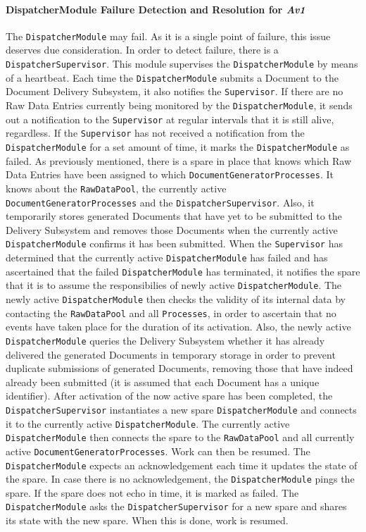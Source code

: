 \documentclass[a4paper,10pt]{article}
\begin{document}
\paragraph{DispatcherModule Failure Detection and Resolution for \emph{Av1}}
The \texttt{DispatcherModule} may fail. As it is a single point of failure, this issue deserves due consideration. In order to detect failure, there is a \texttt{DispatcherSupervisor}. This module supervises the \texttt{DispatcherModule} by means of a heartbeat. Each time the \texttt{DispatcherModule} submits a Document to the Document Delivery Subsystem, it also notifies the \texttt{Supervisor}. If there are no Raw Data Entries currently being monitored by the \texttt{DispatcherModule}, it sends out a notification to the \texttt{Supervisor} at regular intervals that it is still alive, regardless. If the \texttt{Supervisor} has not received a notification from the \texttt{DispatcherModule} for a set amount of time, it marks the \texttt{DispatcherModule} as failed.
As previously mentioned, there is a spare in place that knows which Raw Data Entries have been assigned to which \texttt{DocumentGeneratorProcesses}. It knows about the \texttt{RawDataPool}, the currently active \texttt{DocumentGeneratorProcesses} and the \texttt{DispatcherSupervisor}. Also, it temporarily stores generated Documents that have yet to be submitted to the Delivery Subsystem and removes those Documents when the currently active \texttt{DispatcherModule} confirms it has been submitted. When the \texttt{Supervisor} has determined that the currently active \texttt{DispatcherModule} has failed and has ascertained that the failed \texttt{DispatcherModule} has terminated, it notifies the spare that it is to assume the responsibilies of newly active \texttt{DispatcherModule}. The newly active \texttt{DispatcherModule} then checks the validity of its internal data by contacting the \texttt{RawDataPool} and all \texttt{Processes}, in order to ascertain that no events have taken place for the duration of its activation. Also, the newly active \texttt{DispatcherModule} queries the Delivery Subsystem whether it has already delivered the generated Documents in temporary storage in order to prevent duplicate submissions of generated Documents, removing those that have indeed already been submitted (it is assumed that each Document has a unique identifier). After activation of the now active spare has been completed, the \texttt{DispatcherSupervisor} instantiates a new spare \texttt{DispatcherModule} and connects it to the currently active \texttt{DispatcherModule}. The currently active \texttt{DispatcherModule} then connects the spare to the \texttt{RawDataPool} and all currently active \texttt{DocumentGeneratorProcesses}. Work can then be resumed.
The \texttt{DispatcherModule} expects an acknowledgement each time it updates the state of the spare. In case there is no acknowledgement, the \texttt{DispatcherModule} pings the spare. If the spare does not echo in time, it is marked as failed. The \texttt{DispatcherModule} asks the \texttt{DispatcherSupervisor} for a new spare and shares its state with the new spare. When this is done, work is resumed.
\end{document}
